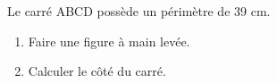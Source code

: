 \documentclass[exercice]{thedocument}%
\begin{document}
%
Le carré ABCD possède un périmètre de 39 cm.
\begin{enumerate}
    \item Faire une figure à main levée.
    \item Calculer le côté du carré.
\end{enumerate}
\end{document}
